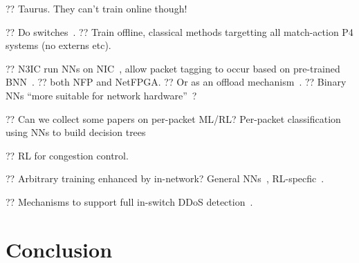 \documentclass[sigconf,natbib=false]{acmart}
\begin{document}
?? Taurus. They can't train online though!~\parencite{DBLP:journals/corr/abs-2002-08987}

?? Do switches~\parencite{DBLP:conf/hotnets/XiongZ19}.
?? Train offline, classical methods targetting all match-action P4 systems (no externs etc).

?? N3IC run NNs on NIC~\parencite{DBLP:journals/corr/abs-2009-02353}, allow packet tagging to occur based on pre-trained BNN~\parencite{DBLP:conf/nips/HubaraCSEB16}.
?? both NFP and NetFPGA.
?? Or as an offload mechanism~\parencite{DBLP:conf/sigcomm/SanvitoSB18,DBLP:journals/corr/abs-1801-05731}.
?? Binary NNs ``more suitable for network hardware''~\parencite{DBLP:journals/corr/MiyashitaLM16}?

?? Can we collect some papers on per-packet ML/RL? Per-packet classification using NNs to build decision trees~\parencite{DBLP:conf/sigcomm/LiangZJS19}

?? RL for congestion control. ~\parencite{DBLP:journals/corr/abs-1910-04054}

?? Arbitrary training enhanced by in-network? General NNs~\parencite{DBLP:conf/micro/LiPAYQPWSEK18}, RL-specfic~\parencite{DBLP:conf/isca/LiLYCSH19}.

?? Mechanisms to support full in-switch DDoS detection~\cite{tnms-ddos-victim-ident}.

\section{Conclusion}
	
%
%
\printbibliography
	
\end{document}
